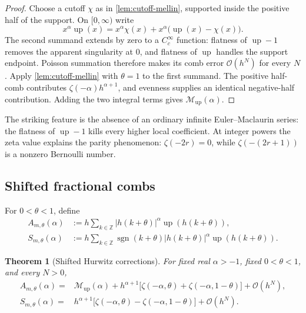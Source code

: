 \documentclass[11pt]{article}
\newtheorem{theorem}{Theorem}[section]
\theoremstyle{definition}
\DeclareMathOperator{\sgn}{sgn}
\newcommand{\Up}{\operatorname{up}}
\newcommand{\Z}{\mathbb{Z}}
\newcommand{\Mell}{\mathcal{M}}
\newcommand{\bigO}{\mathcal{O}}
\begin{document}
\begin{proof}
Choose a cutoff $\chi$ as in \cref{lem:cutoff-mellin}, supported inside the
positive half of the support.  On $[0,\infty)$ write
\[
 x^\alpha\Up(x)=x^\alpha\chi(x)
 +x^\alpha\bigl(\Up(x)-\chi(x)\bigr).
\]
The second summand extends by zero to a $C_c^\infty$ function: flatness of
$\Up-1$ removes the apparent singularity at $0$, and flatness of $\Up$
handles the support endpoint.  Poisson summation therefore makes its comb
error $\bigO(h^N)$ for every $N$.  Apply
\cref{lem:cutoff-mellin} with $\theta=1$ to the first summand.  The positive
half-comb contributes $\zeta(-\alpha)h^{\alpha+1}$, and evenness supplies an
identical negative-half contribution.  Adding the two integral terms gives
$\Mell_{\Up}(\alpha)$.
\end{proof}

The striking feature is the absence of an ordinary infinite Euler--Maclaurin
series: the flatness of $\Up-1$ kills every higher local coefficient.  At
integer powers the zeta value explains the parity phenomenon:
$\zeta(-2r)=0$, while $\zeta(-(2r+1))$ is a nonzero Bernoulli number.

\subsection{Shifted fractional combs}

For $0<\theta<1$, define
\begin{align}
 A_{m,\theta}(\alpha)
 &:=h\sum_{k\in\Z}|h(k+\theta)|^\alpha
 \Up(h(k+\theta)),
 \label{eq:shifted-abs-alpha}\\
 S_{m,\theta}(\alpha)
 &:=h\sum_{k\in\Z}\sgn(k+\theta)|h(k+\theta)|^\alpha
 \Up(h(k+\theta)).
 \label{eq:shifted-signed-alpha}
\end{align}

\begin{theorem}[Shifted Hurwitz corrections]
\label{thm:shifted-Hurwitz}
For fixed real $\alpha>-1$, fixed $0<\theta<1$, and every $N>0$,
\begin{align}
 A_{m,\theta}(\alpha)
 ={}&\Mell_{\Up}(\alpha)
 +h^{\alpha+1}\bigl[
 \zeta(-\alpha,\theta)+\zeta(-\alpha,1-\theta)
 \bigr]
 +\bigO(h^N),
 \label{eq:shifted-abs-Hurwitz}\\
 S_{m,\theta}(\alpha)
 ={}&h^{\alpha+1}\bigl[
 \zeta(-\alpha,\theta)-\zeta(-\alpha,1-\theta)
 \bigr]
 +\bigO(h^N).
 \label{eq:shifted-signed-Hurwitz}
\end{align}
\end{theorem}
\end{document}
